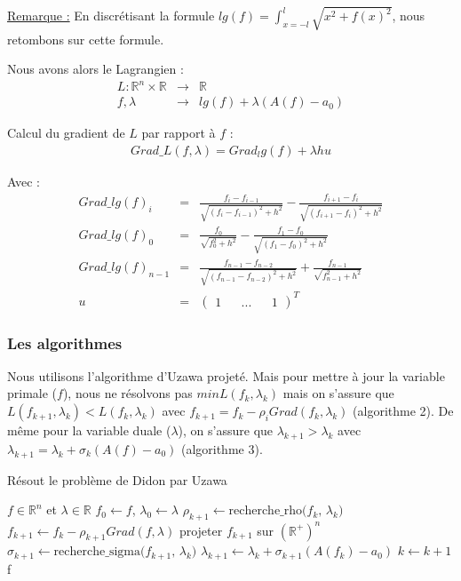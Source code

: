 \documentclass[10pt,a4paper]{article}
\newcommand{\R}{\mathbb{R}}
\theoremstyle{plain}
\theoremstyle{definition}
\begin{document}
\underline{Remarque :} En discrétisant la formule $lg(f) = \int_{x=-l}^{l}{\sqrt{x^2+f(x)^2}}$, nous retombons sur cette formule.
\newline

Nous avons alors le Lagrangien :
\begin{eqnarray*}
L : \mathbb{R}^n \times \mathbb{R} &\rightarrow & \mathbb{R} \\
f, \lambda &\rightarrow & lg(f) + \lambda (A(f)-a_0)
\end{eqnarray*}

Calcul du gradient de $L$ par rapport à $f$ :
\begin{eqnarray*}
Grad\_L(f, \lambda) = Grad_lg(f) + \lambda h u
\end{eqnarray*}

Avec :
\begin{eqnarray*}
Grad\_ lg(f)_i &=& \frac{f_i-f_{i-1}}{\sqrt{(f_i-f_{i-1})^2+h^2}} - \frac{f_{i+1}-f_i}{\sqrt{(f_{i+1}-f_i)^2+h^2}} \\
Grad\_ lg(f)_0 &=& \frac{f_0}{\sqrt{f_0^2+h^2}} - \frac{f_{1}-f_0}{\sqrt{(f_{1}-f_0)^2+h^2}} \\
Grad\_ lg(f)_{n-1} &=& \frac{f_{n-1}-f_{n-2}}{\sqrt{(f_{n-1}-f_{n-2})^2+h^2}} + \frac{f_{n-1}}{\sqrt{f_{n-1}^2+h^2}} \\
u &=& (\begin{matrix} 1 && ... && 1 \end{matrix})^T
\end{eqnarray*}

\subsubsection{Les algorithmes}

Nous utilisons l'algorithme d'Uzawa projeté. Mais pour mettre à jour la variable primale ($f$), nous ne résolvons pas $min L(f_k,\lambda_k)$ mais on s'assure que $L(f_{k+1},\lambda_k) < L(f_k,\lambda_k)$ avec $f_{k+1} = f_k - \rho_i Grad(f_k,\lambda_k)$ (algorithme 2). De même pour la variable duale ($\lambda$), on s'assure que $\lambda_{k+1} > \lambda_k$ avec $\lambda_{k+1} = \lambda_k + \sigma_k (A(f)-a_0)$ (algorithme 3).

\begin{algorithm}
\caption{Résout le problème de Didon par Uzawa}

\begin{algorithmic}
	\REQUIRE $f \in \R^n$ et $\lambda \in \R$
	\STATE $f_0 \leftarrow f$, $\lambda_0 \leftarrow \lambda$
		\STATE $\rho_{k+1} \leftarrow \text{recherche\_rho($f_k$, $\lambda_k$)}$
		\STATE $f_{k+1} \leftarrow f_k - \rho_{k+1} Grad(f,\lambda)$
		\STATE projeter $f_{k+1}$ sur $(\R^+)^n$
		\STATE $\sigma_{k+1} \leftarrow \text{recherche\_sigma($f_{k+1}$, $\lambda_k$)}$
		\STATE $\lambda_{k+1} \leftarrow \lambda_k + \sigma_{k+1} (A(f_{k})-a_0)$
		\STATE $k \leftarrow k+1$
	\ENDWHILE
	\RETURN f
\end{algorithmic}

\end{algorithm}
\end{document}
